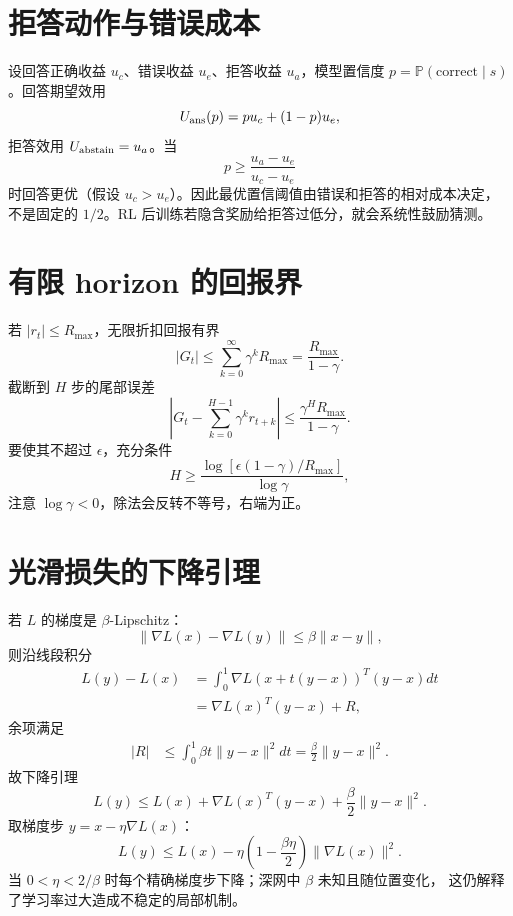 \documentclass[11pt]{article}
\numberwithin{equation}{section}
\newcommand{\Pp}{\mathbb{P}}
\newcommand{\1}{\mathbf{1}}
\begin{document}
\section{拒答动作与错误成本}

设回答正确收益 $u_c$、错误收益 $u_e$、拒答收益 $u_a$，模型置信度
$p=\Pp(\text{correct}\mid s)$。回答期望效用
\begin{equation}
 U_{\rm ans}(p)=pu_c+(1-p)u_e,
\end{equation}
拒答效用 $U_{\rm abstain}=u_a$。当
\begin{equation}
 p\ge\frac{u_a-u_e}{u_c-u_e}
\end{equation}
时回答更优（假设 $u_c>u_e$）。因此最优置信阈值由错误和拒答的相对成本决定，
不是固定的 $1/2$。RL 后训练若隐含奖励给拒答过低分，就会系统性鼓励猜测。

\section{有限 horizon 的回报界}

若 $|r_t|\le R_{\max}$，无限折扣回报有界
\begin{equation}
 |G_t|\le\sum_{k=0}^{\infty}\gamma^kR_{\max}
 =\frac{R_{\max}}{1-\gamma}.
\end{equation}
截断到 $H$ 步的尾部误差
\begin{equation}
 \left|G_t-\sum_{k=0}^{H-1}\gamma^kr_{t+k}\right|
 \le\frac{\gamma^HR_{\max}}{1-\gamma}.
\end{equation}
要使其不超过 $\epsilon$，充分条件
\begin{equation}
 H\ge\frac{\log[\epsilon(1-\gamma)/R_{\max}]}{\log\gamma},
\end{equation}
注意 $\log\gamma<0$，除法会反转不等号，右端为正。

\section{光滑损失的下降引理}

若 $L$ 的梯度是 $\beta$-Lipschitz：
\begin{equation}
 \|\nabla L(x)-\nabla L(y)\|
 \le\beta\|x-y\|,
\end{equation}
则沿线段积分
\begin{align}
 L(y)-L(x)
 &=\int_0^1\nabla L(x+t(y-x))^T(y-x)dt\\
 &=\nabla L(x)^T(y-x)+R,
\end{align}
余项满足
\begin{align}
 |R|
 &\le\int_0^1\beta t\|y-x\|^2dt
 =\frac\beta2\|y-x\|^2.
\end{align}
故下降引理
\begin{equation}
 L(y)\le L(x)+\nabla L(x)^T(y-x)
 +\frac\beta2\|y-x\|^2.
\end{equation}
取梯度步 $y=x-\eta\nabla L(x)$：
\begin{equation}
 L(y)\le L(x)-\eta\left(1-\frac{\beta\eta}{2}\right)
 \|\nabla L(x)\|^2.
\end{equation}
当 $0<\eta<2/\beta$ 时每个精确梯度步下降；深网中 $\beta$ 未知且随位置变化，
这仍解释了学习率过大造成不稳定的局部机制。
\end{document}
